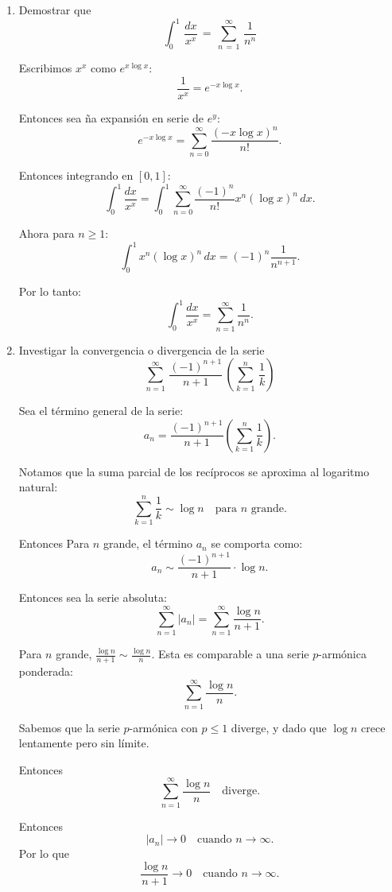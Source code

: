 \documentclass{article}
\begin{document}
\begin{enumerate}
Esta reordenación converge exactamente al valor deseado \(\log 5\).






\item Demostrar que
\[
\int_0^1\,\dfrac{dx}{x^x}\,=\,\sum_{n\,=\,1}^\infty\,\frac{1}{n^n}
\]

Escribimos \(x^x\) como \(e^{x \log x}\):  
\[
\frac{1}{x^x} = e^{-x \log x}.
\]

Entonces sea ña expansión en serie de \(e^y\):  
\[
e^{-x \log x} = \sum_{n=0}^\infty \frac{(-x \log x)^n}{n!}.
\]

Entonces integrando en \([0, 1]\):  
\[
\int_0^1 \frac{dx}{x^x} = \int_0^1 \sum_{n=0}^\infty \frac{(-1)^n}{n!} x^n (\log x)^n \, dx.
\]

Ahora para \(n \geq 1\):  
\[
\int_0^1 x^n (\log x)^n \, dx = (-1)^n \frac{1}{n^{n+1}}.
\]

Por lo tanto:  
\[
\int_0^1 \frac{dx}{x^x} = \sum_{n=1}^\infty \frac{1}{n^n}.
\]


\item Investigar la convergencia o divergencia de la serie
\[
\sum_{n=1}^\infty\,\dfrac{(-1)^{n+1}}{n+1}\,\left(\sum_{k=1}^n\,\dfrac{1}{k}\right)
\]

Sea el término general de la serie:  
\[
a_n = \frac{(-1)^{n+1}}{n+1} \left( \sum_{k=1}^n \frac{1}{k} \right).
\]

Notamos que la suma parcial de los recíprocos se aproxima al logaritmo natural:  
   \[
   \sum_{k=1}^n \frac{1}{k} \sim \log n \quad \text{para \(n\) grande.}
   \]

Entonces 
   Para \(n\) grande, el término \(a_n\) se comporta como:  
   \[
   a_n \sim \frac{(-1)^{n+1}}{n+1} \cdot \log n.
   \]

Entonces sea la serie absoluta:  
\[
\sum_{n=1}^\infty \left| a_n \right| = \sum_{n=1}^\infty \frac{\log n}{n+1}.
\]

Para \(n\) grande, \(\frac{\log n}{n+1} \sim \frac{\log n}{n}\). Esta es comparable a una serie \(p\)-armónica ponderada:  
\[
\sum_{n=1}^\infty \frac{\log n}{n}.
\]

Sabemos que la serie \(p\)-armónica con \(p \leq 1\) diverge, y dado que \(\log n\) crece lentamente pero sin límite.

Entonces
\[
\sum_{n=1}^\infty \frac{\log n}{n} \quad \text{diverge.}
\]

Entonces
   \[
   \left| a_n \right| \to 0 \quad \text{cuando } n \to \infty.
   \]
Por lo que  
   \[
   \frac{\log n}{n+1} \to 0 \quad \text{cuando } n \to \infty.
   \]


\end{enumerate}
\end{document}
